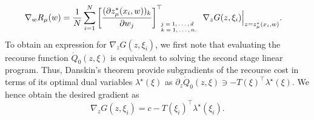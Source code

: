\documentclass{article}
\newcommand{\vl}[1]{{\color{blue}VL:#1}}
\begin{document}
\begin{align}
 \nabla_w R_\mu(w) &= \frac{1}{N} \sum_{i = 1}^N \left[\frac{(\partial z^*_{\mu}(x_i,w))_k}{\partial w_j} \right]_{\tiny{\begin{array}{l}
j=1,\dots,d \\
k=1,\dots,n.
\end{array}}}^\top \nabla_z G(z, \xi_i)\Big|_{z=z^*_{\mu}(x_i,w)}. \label{eq:der_R}
\end{align}
%
To obtain an expression for $\nabla_z G(z, \xi_i)$, we
first note that evaluating the recourse function $\dot Q_0(z, \xi)$ is equivalent to
solving the second stage linear program.
Thus, Danskin’s theorem provide subgradients of the
recourse cost in terms of its optimal dual variables
$\lambda^\star(\xi)$ as $\partial_z \dot Q_0(z,\xi) \ni -T(\xi)^\top
    \lambda^\star(\xi)$.
We hence obtain the desired gradient as
\begin{equation}
    \nabla_z G(z, \xi_i) = c - T(\xi_i)^\top \lambda^\star(\xi_i).
\end{equation}


\end{document}

